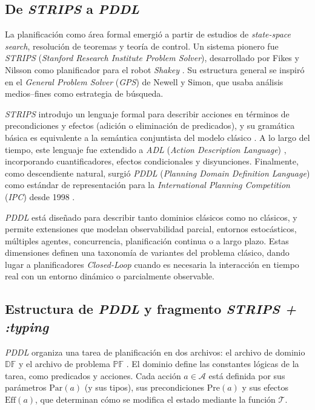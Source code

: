 \subsection{De \textit{STRIPS} a \textit{PDDL}}

La planificación como área formal emergió a partir de estudios de \textit{state-space search}, resolución de teoremas y teoría de control. Un sistema pionero fue \textit{STRIPS} (\textit{Stanford Research Institute Problem Solver}), desarrollado por Fikes y Nilsson como planificador para el robot \textit{Shakey} \parencite{peter2021modern}. Su estructura general se inspiró en el \textit{General Problem Solver} (\textit{GPS}) de Newell y Simon, que usaba análisis medios–fines como estrategia de búsqueda.

\textit{STRIPS} introdujo un lenguaje formal para describir acciones en términos de precondiciones y efectos (adición o eliminación de predicados), y su gramática básica es equivalente a la semántica conjuntista del modelo clásico \parencite{ghallab2004automated}. A lo largo del tiempo, este lenguaje fue extendido a \textit{ADL} (\textit{Action Description Language}) \parencite{pednault1987formulating}, incorporando cuantificadores, efectos condicionales y disyunciones. Finalmente, como descendiente natural, surgió \textit{PDDL} (\textit{Planning Domain Definition Language}) como estándar de representación para la \textit{International Planning Competition} (\textit{IPC}) desde 1998 \parencite{aeronautiques1998pddl}.

\textit{PDDL} está diseñado para describir tanto dominios clásicos como no clásicos, y permite extensiones que modelan observabilidad parcial, entornos estocásticos, múltiples agentes, concurrencia, planificación continua o a largo plazo. Estas dimensiones definen una taxonomía de variantes del problema clásico, dando lugar a planificadores \textit{Closed-Loop} cuando es necesaria la interacción en tiempo real con un entorno dinámico o parcialmente observable.

\subsection{Estructura de \textit{PDDL} y fragmento \textit{STRIPS + :typing}}

\textit{PDDL} organiza una tarea de planificación en dos archivos: el archivo de dominio $\mathbb{DF}$ y el archivo de problema $\mathbb{PF}$ \parencite{tantakoun2025llms}. El dominio define las constantes lógicas de la tarea, como predicados y acciones. Cada acción $a \in \mathcal{A}$ está definida por sus parámetros $\mathrm{Par}(a)$ (y sus tipos), sus precondiciones $\mathrm{Pre}(a)$ y sus efectos $\mathrm{Eff}(a)$, que determinan cómo se modifica el estado mediante la función $\mathcal{T}$.

